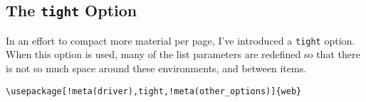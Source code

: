 \documentclass{article}
\let\pkg\textsf
\edef\amtIndent{\the\parindent}
\begin{document}
{%
%
%
%
%
%


\subsection{The \texttt{tight} Option}\label{sss:webtight}

In an effort to compact more material per page, I've introduced a
\texttt{tight} option.  When this option is used, many of the list
parameters are redefined so that there is not so much space around these
environments, and between items.
\begin{Verbatim}[xleftmargin=\amtIndent,commandchars=!()]
\usepackage[!meta(driver),tight,!meta(other_options)]{web}
\end{Verbatim}

}
\end{document}
